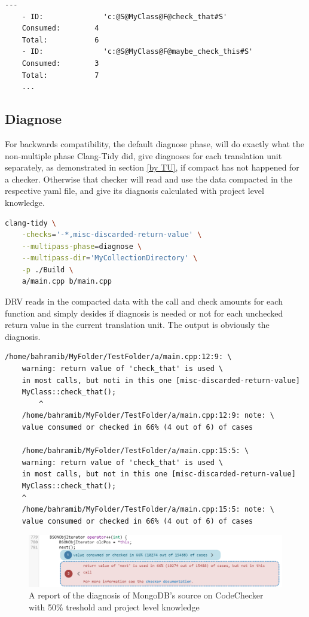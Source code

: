 \begin{lstlisting}[caption={Contents of the compacted file},captionpos=b]
	---
	- ID:              'c:@S@MyClass@F@check_that#S'
	Consumed:        4
	Total:           6
	- ID:              'c:@S@MyClass@F@maybe_check_this#S'
	Consumed:        3
	Total:           7
	...
\end{lstlisting}

\subsection{Diagnose}

For backwards compatibility, the default diagnose phase, will do exactly what the non-multiple
phase Clang-Tidy did, give diagnoses for each translation unit separately, as demonstrated in section \cref{by TU},
if compact has not happened for a checker. Otherwise that checker will read and use the data compacted
in the respective yaml file, and give its diagnosis calculated with project level knowledge.

\begin{lstlisting}[language={bash}]
	clang-tidy \
	-checks='-*,misc-discarded-return-value' \
	--multipass-phase=diagnose \
	--multipass-dir='MyCollectionDirectory' \
	-p ./Build \
	a/main.cpp b/main.cpp
\end{lstlisting}

DRV reads in the compacted data with the call and check amounts for each function and simply desides
if diagnosis is needed or not for each unchecked return value in the current translation unit.
The output is obviously the diagnosis.

\begin{lstlisting}[caption={Diagnosis output with project level knowledge},captionpos=b]
	/home/bahramib/MyFolder/TestFolder/a/main.cpp:12:9: \
	warning: return value of 'check_that' is used \
	in most calls, but noti in this one [misc-discarded-return-value]
	MyClass::check_that();
		^
	/home/bahramib/MyFolder/TestFolder/a/main.cpp:12:9: note: \
	value consumed or checked in 66% (4 out of 6) of cases

	/home/bahramib/MyFolder/TestFolder/a/main.cpp:15:5: \
	warning: return value of 'check_that' is used \
	in most calls, but not in this one [misc-discarded-return-value]
	MyClass::check_that();
	^
	/home/bahramib/MyFolder/TestFolder/a/main.cpp:15:5: note: \
	value consumed or checked in 66% (4 out of 6) of cases
\end{lstlisting}

\begin{figure}
	\label{fig:mongo50multi}
	\includegraphics[width=\linewidth]{images/codechecker_first_ss_mongo_multi_50.png}
	\caption{A report of the diagnosis of MongoDB's source on CodeChecker with 50\% treshold and project level knowledge}
\end{figure}

